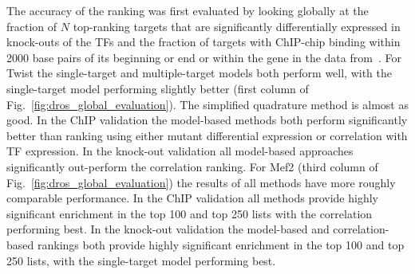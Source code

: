 \documentclass{pnastwo}
\begin{document}
\begin{article}
The accuracy of the ranking was first evaluated by looking globally at
the fraction of $N$ top-ranking targets that are significantly
differentially expressed in knock-outs of the TFs and the fraction
of targets with ChIP-chip binding within 2000 base
pairs of its beginning or end or within the gene in the data
from~\cite{Zinzen2009}. For Twist the single-target and
multiple-target models both perform well, with the single-target model
performing slightly better (first column of
Fig.~\ref{fig:dros_global_evaluation}). The simplified quadrature
method is almost as good. In the ChIP validation the
model-based methods both perform significantly better than ranking
using either mutant differential expression or correlation with TF
expression. In the knock-out validation all model-based approaches
significantly out-perform the correlation ranking. For Mef2
(third column of Fig.~\ref{fig:dros_global_evaluation}) the results of all
methods have more roughly comparable performance. In the ChIP validation all
methods provide highly significant enrichment in the top 100 and top
250 lists with the correlation performing best. In the knock-out
validation the model-based and correlation-based rankings both provide
highly significant enrichment in the top 100 and top 250 lists, with
the single-target model performing best.



\end{article}
\end{document}
